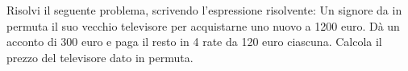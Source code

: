 \item Risolvi il seguente problema, scrivendo l'espressione risolvente: Un signore da in permuta il suo vecchio televisore per acquistarne uno nuovo a 1200 euro. Dà un acconto di 300 euro e paga il resto in 4 rate da 120 euro ciascuna. Calcola il prezzo del televisore dato in permuta.